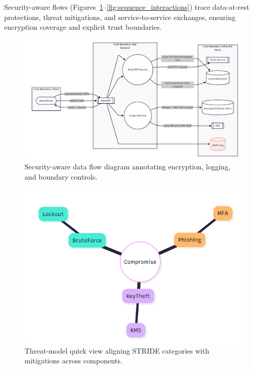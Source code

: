 \documentclass[conference]{IEEEtran}
\begin{document}
Security-aware flows (Figures~\ref{fig:security_flow}--\ref{fig:sequence_interactions}) trace data-at-rest protections, threat mitigations, and service-to-service exchanges, ensuring encryption coverage and explicit trust boundaries.

\begin{figure}[t]
  \centering
  \includegraphics[width=0.9\linewidth]{security_aware_data_flow.png}
  \caption{Security-aware data flow diagram annotating encryption, logging, and boundary controls.}
  \label{fig:security_flow}
\end{figure}

\begin{figure}[t]
  \centering
  \includegraphics[width=0.85\linewidth]{threat_model_quickview.png}
  \caption{Threat-model quick view aligning STRIDE categories with mitigations across components.}
  \label{fig:threat_model}
\end{figure}
\end{document}
